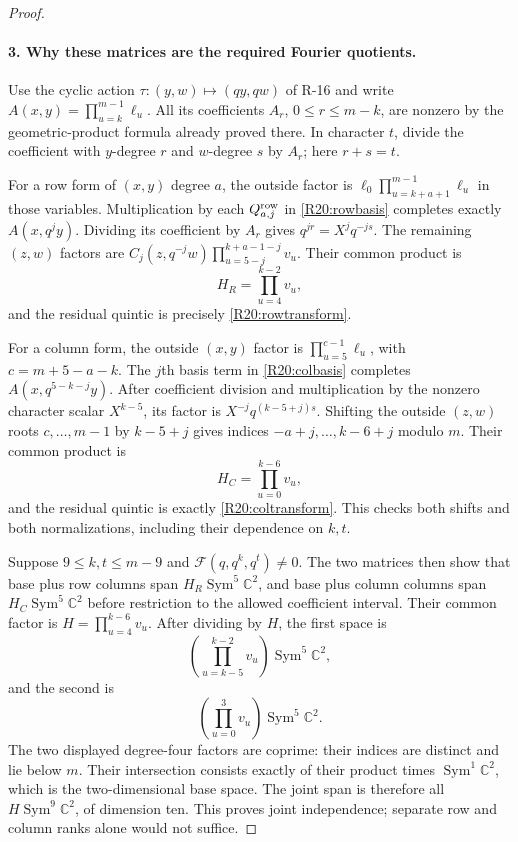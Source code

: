 \documentclass[11pt,a4paper]{article}
\theoremstyle{definition}\newtheorem{definition}{Definition}
\begin{document}
\begin{proof}
\paragraph{3. Why these matrices are the required Fourier quotients.}
Use the cyclic action $\tau:(y,w)\mapsto(qy,qw)$ of R-16 and
write $A(x,y)=\prod_{u=k}^{m-1}\ell_u$.
All its coefficients $A_r$, $0\leq r\leq m-k$, are nonzero by
the geometric-product formula already proved there. In character
$t$, divide the coefficient with $y$-degree $r$ and $w$-degree
$s$ by $A_r$; here $r+s=t$.

For a row form of $(x,y)$ degree $a$, the outside factor is
$\ell_0\prod_{u=k+a+1}^{m-1}\ell_u$ in those variables.
Multiplication by each $Q^{\rm row}_{a,j}$ in
\eqref{R20:rowbasis} completes exactly $A(x,q^jy)$.
Dividing its coefficient by $A_r$ gives $q^{jr}=X^jq^{-js}$.
The remaining $(z,w)$ factors are
$C_j(z,q^{-j}w)\prod_{u=5-j}^{k+a-1-j}v_u$.
Their common product is
\[
 H_R=\prod_{u=4}^{k-2}v_u,
\]
and the residual quintic is precisely
\eqref{R20:rowtransform}.

For a column form, the outside $(x,y)$ factor is
$\prod_{u=5}^{c-1}\ell_u$, with $c=m+5-a-k$.
The $j$th basis term in \eqref{R20:colbasis} completes
$A(x,q^{5-k-j}y)$. After coefficient division and multiplication
by the nonzero character scalar $X^{k-5}$, its factor is
$X^{-j}q^{(k-5+j)s}$.
Shifting the outside $(z,w)$ roots $c,\ldots,m-1$ by
$k-5+j$ gives indices $-a+j,\ldots,k-6+j$ modulo $m$.
Their common product is
\[
 H_C=\prod_{u=0}^{k-6}v_u,
\]
and the residual quintic is exactly
\eqref{R20:coltransform}. This checks both shifts and both
normalizations, including their dependence on $k,t$.

Suppose $9\leq k,t\leq m-9$ and
$\mathscr F(q,q^k,q^t)\ne0$. The two matrices then show that
base plus row columns span $H_R\operatorname{Sym}^5\mathbb C^2$,
and base plus column columns span
$H_C\operatorname{Sym}^5\mathbb C^2$ before restriction to the
allowed coefficient interval. Their common factor is
$H=\prod_{u=4}^{k-6}v_u$. After dividing by $H$, the first space is
\[
 \left(\prod_{u=k-5}^{k-2}v_u\right)
                 \operatorname{Sym}^5\mathbb C^2,
\]
and the second is
\[
 \left(\prod_{u=0}^{3}v_u\right)
                 \operatorname{Sym}^5\mathbb C^2.
\]
The two displayed degree-four factors are coprime: their indices
are distinct and lie below $m$. Their intersection consists exactly
of their product times $\operatorname{Sym}^1\mathbb C^2$,
which is the two-dimensional base space. The joint span is therefore
all $H\operatorname{Sym}^9\mathbb C^2$, of dimension ten.
This proves joint independence; separate row and column ranks alone
would not suffice.


\end{proof}
\end{document}
